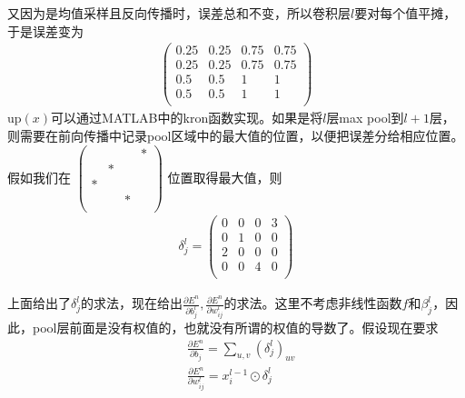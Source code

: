             又因为是均值采样且反向传播时，误差总和不变，所以卷积层$l$要对每个值平摊，于是误差变为
            \begin{align*}
            \begin{pmatrix}
            0.25 & 0.25 & 0.75 & 0.75\\
            0.25 & 0.25 & 0.75 & 0.75\\
            0.5  & 0.5  & 1    & 1   \\
            0.5  & 0.5  & 1    & 1   \\
            \end{pmatrix}
            \end{align*}
            $\mathrm{up}(x)$可以通过MATLAB中的kron函数实现。如果是将$l$层max pool到$l+1$层，则需要在前向传播中记录pool区域中的最大值的位置，以便把误差分给相应位置。假如我们在
            \begin{math}
            \left(
            \begin{smallmatrix}
             & & &*\\
             &*& & \\
            *& & & \\
             & &*& \\
            \end{smallmatrix}
            \right)
            \end{math}
            位置取得最大值，则
            \begin{align*}
            \delta_j^l =
            \begin{pmatrix}
            0 & 0 & 0 & 3\\
            0 & 1 & 0 & 0\\
            2 & 0 & 0 & 0\\
            0 & 0 & 4 & 0\\
            \end{pmatrix}
            \end{align*}
            \par
            上面给出了$\delta_j^l$的求法，现在给出$\frac{\partial E^n}{\partial b_j^l},\frac{\partial E^n}{\partial w_{ij}^l}$的求法。这里不考虑非线性函数$f$和$\beta_j^l$，因此，pool层前面是没有权值的，也就没有所谓的权值的导数了。假设现在要求
            \begin{align*}
            & \frac{\partial E^n}{\partial b_j} = \sum_{u,v} \left( \delta_j^l \right)_{uv} \\
            & \frac{\partial E^n}{\partial w_{ij}^l} = x_i^{l-1}\odot \delta_j^l
            \end{align*}
